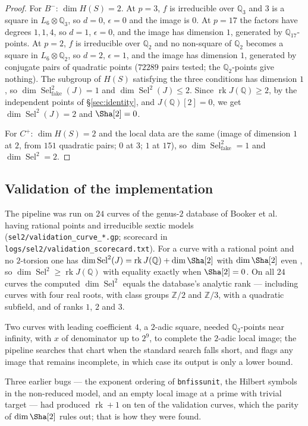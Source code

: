 \documentclass[11pt,reqno]{amsart}
\theoremstyle{plain}
\theoremstyle{definition}
\newcommand{\Q}{\mathbb{Q}}
\newcommand{\Z}{\mathbb{Z}}
\DeclareMathOperator{\rk}{rk}
\DeclareMathOperator{\Sel}{Sel}
\newcommand{\fake}{\mathrm{fake}}
\numberwithin{equation}{section}
\begin{document}
\begin{proof}
For $B^{-}$: $\dim H(S)=2$. At $p=3$, $f$ is irreducible over $\Q_{3}$ and $3$ is
a square in $L_{6}\otimes\Q_{3}$, so $d=0$, $\epsilon=0$ and the image is $0$. At
$p=17$ the factors have degrees $1,1,4$, so $d=1$, $\epsilon=0$, and the image
has dimension $1$, generated by $\Q_{17}$-points. At $p=2$, $f$ is irreducible
over $\Q_{2}$ and no non-square of $\Q_{2}$ becomes a square in
$L_{6}\otimes\Q_{2}$, so $d=2$, $\epsilon=1$, and the image has dimension $1$,
generated by conjugate pairs of quadratic points ($72289$ pairs tested; the
$\Q_{2}$-points give nothing). The subgroup of $H(S)$ satisfying the three
conditions has dimension $1$, so $\dim\Sel^{2}_{\fake}(J)=1$ and
$\dim\Sel^{2}(J)\le2$. Since $\rk J(\Q)\ge2$, by the independent points of
\S\ref{sec:identity}, and $J(\Q)[2]=0$, we get $\dim\Sel^{2}(J)=2$ and
$\Sha[2]=0$.

For $C^{+}$: $\dim H(S)=2$ and the local data are the same (image of dimension
$1$ at $2$, from $151$ quadratic pairs; $0$ at $3$; $1$ at $17$), so
$\dim\Sel^{2}_{\fake}=1$ and $\dim\Sel^{2}=2$.
\end{proof}

\subsection{Validation of the implementation}

The pipeline was run on $24$ curves of the genus-$2$ database of Booker et
al.\ \cite{BSSVY} having rational points and irreducible sextic models
(\texttt{sel2/validation\_curve\_*.gp}; scorecard in
\texttt{logs/sel2/validation\_scorecard.txt}). For a curve with a rational point
and no $2$-torsion one has $\dim\Sel^{2}(J)=\rk J(\Q)+\dim\Sha[2]$ with
$\dim\Sha[2]$ even \cite{PoonenStoll}, so $\dim\Sel^{2}\ge\rk J(\Q)$ with
equality exactly when $\Sha[2]=0$. On all $24$ curves the computed
$\dim\Sel^{2}$ equals the database's analytic rank --- including curves with four
real roots, with class groups $\Z/2$ and $\Z/3$, with a quadratic subfield, and
of ranks $1$, $2$ and $3$.

Two curves with leading coefficient $4$, a $2$-adic square, needed
$\Q_{2}$-points near infinity, with $x$ of denominator up to $2^{9}$, to
complete the $2$-adic local image; the pipeline searches that chart when the
standard search falls short, and flags any image that remains incomplete, in
which case its output is only a lower bound.

Three earlier bugs --- the exponent ordering of \texttt{bnfissunit}, the Hilbert
symbols in the non-reduced model, and an empty local image at a prime with
trivial target --- had produced $\rk+1$ on ten of the validation curves, which the
parity of $\dim\Sha[2]$ rules out; that is how they were found.
\end{document}
